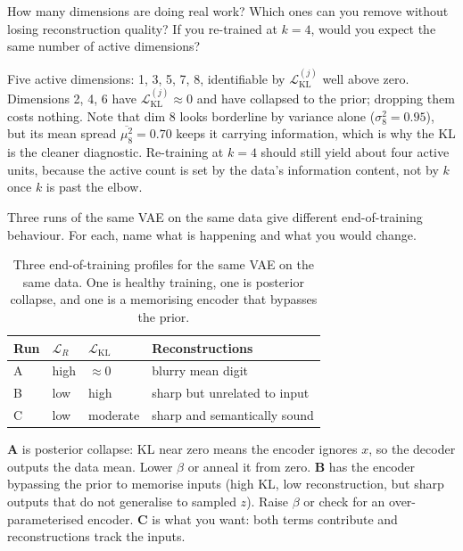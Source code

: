How many dimensions are doing real work? Which ones can you remove without losing reconstruction quality? If you re-trained at $k{=}4$, would you expect the same number of active dimensions?

Five active dimensions: 1, 3, 5, 7, 8, identifiable by $\mathcal{L}_{\text{KL}}^{(j)}$ well above zero. Dimensions 2, 4, 6 have $\mathcal{L}_{\text{KL}}^{(j)} \approx 0$ and have collapsed to the prior; dropping them costs nothing. Note that dim 8 looks borderline by variance alone ($\sigma_8^2 = 0.95$), but its mean spread $\overline{\mu_8^2} = 0.70$ keeps it carrying information, which is why the KL is the cleaner diagnostic. Re-training at $k{=}4$ should still yield about four active units, because the active count is set by the data's information content, not by $k$ once $k$ is past the elbow.


\vspace{2.5em}


Three runs of the same VAE on the same data give different end-of-training behaviour. For each, name what is happening and what you would change.

\begin{table}[ht]
\centering
\begin{tabular}{p{}p{}p{}p{}}
    \toprule
    \textbf{Run} & \textbf{$\mathcal{L}_R$} & \textbf{$\mathcal{L}_{\text{KL}}$} & \textbf{Reconstructions} \\
    \midrule
    A    & high  & $\approx 0$  & blurry mean digit \\
    B    & low   & high         & sharp but unrelated to input \\
    C    & low   & moderate     & sharp and semantically sound \\
    \bottomrule
\end{tabular}
\vspace{2em}
\caption{Three end-of-training profiles for the same VAE on the same data. One is healthy training, one is posterior collapse, and one is a memorising encoder that bypasses the prior.}
\label{tab:diagnose_run}
\end{table}

\textbf{A} is posterior collapse: KL near zero means the encoder ignores $x$, so the decoder outputs the data mean. Lower $\beta$ or anneal it from zero. \textbf{B} has the encoder bypassing the prior to memorise inputs (high KL, low reconstruction, but sharp outputs that do not generalise to sampled $z$). Raise $\beta$ or check for an over-parameterised encoder. \textbf{C} is what you want: both terms contribute and reconstructions track the inputs.


